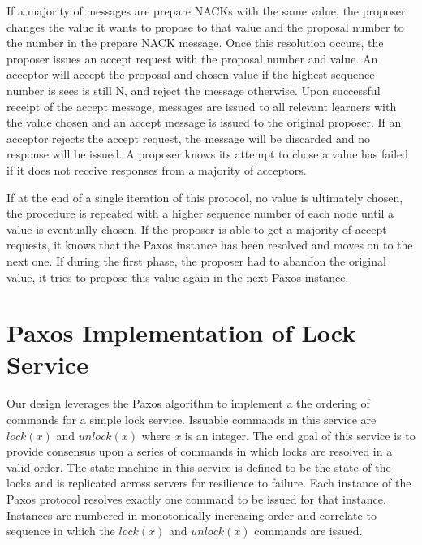\documentclass{article}
\begin{document}
If a majority of messages are prepare NACKs with the same value, the proposer changes the value it wants to propose to that value and the proposal number to the number in the prepare NACK message.
Once this resolution occurs, the proposer issues an accept request with the proposal number and value.
An acceptor will accept the proposal and chosen value if the highest sequence number is sees is still N, and reject the message otherwise.
Upon successful receipt of the accept message, messages are issued to all relevant learners with the value chosen and an accept message is issued to the original proposer.
If an acceptor rejects the accept request, the message will be discarded and no response will be issued.
A proposer knows its attempt to chose a value has failed if it does not receive responses from a majority of acceptors.

If at the end of a single iteration of this protocol, no value is ultimately chosen, the procedure is repeated with a higher sequence number of each node until a value is eventually chosen.
If the proposer is able to get a majority of accept requests, it knows that the Paxos instance has been resolved and moves on to the next one.
If during the first phase, the proposer had to abandon the original value, it tries to propose this value again in the next Paxos instance.


\section{Paxos Implementation of Lock Service}

Our design leverages the Paxos algorithm to implement a the ordering of commands for a simple lock service.
Issuable commands in this service are $lock(x)$ and $unlock(x)$ where $x$ is an integer.
The end goal of this service is to provide consensus upon a series of commands in which locks are resolved in a valid order.
The state machine in this service is defined to be the state of the locks and is replicated across servers for resilience to failure.
Each instance of the Paxos protocol resolves exactly one command to be issued for that instance.
Instances are numbered in monotonically increasing order and correlate to sequence in which the $lock(x)$ and $unlock(x)$ commands are issued.
\end{document}
